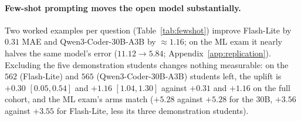 \paragraph{Few-shot prompting moves the open model substantially.}
\label{sec:open:fewshot}
Two worked examples per question (Table~\ref{tab:fewshot}) improve Flash-Lite by $0.31$ MAE and Qwen3-Coder-$30$B-A$3$B by $\approx 1.16$; on the ML exam it nearly halves the same model's error ($11.12 \to 5.84$; Appendix~\ref{app:replication}). Excluding the five demonstration students changes nothing measurable: on the $562$ (Flash-Lite) and $565$ (Qwen3-Coder-$30$B-A$3$B) students left, the uplift is $+0.30$ $[0.05, 0.54]$ and $+1.16$ $[1.04, 1.30]$ against $+0.31$ and $+1.16$ on the full cohort, and the ML exam's arms match ($+5.28$ against $+5.28$ for the $30$B, $+3.56$ against $+3.55$ for Flash-Lite, less its three demonstration students).

